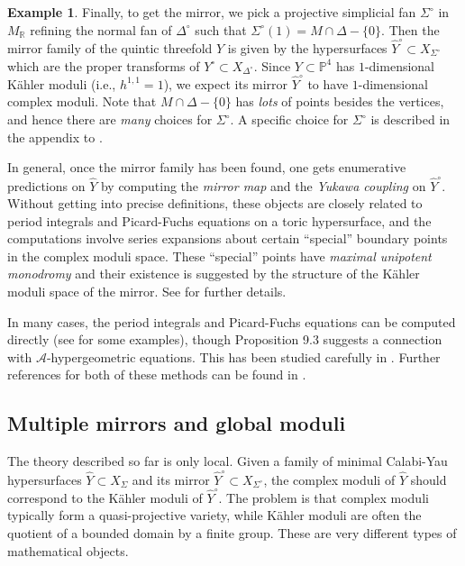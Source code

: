 \documentclass{amsart}
\theoremstyle{plain}
\theoremstyle{definition}
\newtheorem*{example}{Example}
\begin{document}
\begin{example}
	Finally, to get the mirror, we pick a projective simplicial
fan $\Sigma^\circ$ in $M_\mathbb{R}$ refining the normal fan of
$\Delta^\circ$ such that $\Sigma^\circ(1) = M\cap\Delta-\{0\}$.  Then
the mirror family of the quintic threefold $Y$ is given by the
hypersurfaces $\widehat Y^\circ \subset X_{\Sigma^\circ}$ which are
the proper transforms of $Y^\circ \subset X_{\Delta^\circ}$.  Since $Y
\subset \mathbb{P}^4$ has $1$-dimensional K\"ahler moduli (i.e.,
$h^{1,1} = 1$), we expect its mirror $\widehat Y^\circ$ to have
$1$-dimensional complex moduli.  Note that $M\cap\Delta-\{0\}$ has
{\it lots\/} of points besides the vertices, and hence there are {\it
many\/} choices for $\Sigma^\circ$.  A specific choice for
$\Sigma^\circ$ is described in the appendix to
\cite{Mor3}.
\end{example}

	In general, once the mirror family has been found, one gets
enumerative predictions on $\widehat Y$ by computing the {\it mirror
map\/} and the {\it Yukawa coupling\/} on $\widehat Y^\circ$.  Without
getting into precise definitions, these objects are closely related to
period integrals and Picard-Fuchs equations on a toric hypersurface,
and the computations involve series expansions about certain
``special'' boundary points in the complex moduli space.  These
``special'' points have {\it maximal unipotent monodromy\/} and their
existence is suggested by the structure of the K\"ahler moduli space
of the mirror.  See \cite{Mor2,Mor3} for further details.

	In many cases, the period integrals and Picard-Fuchs equations
can be computed directly (see \cite{Mor4} for some examples), though
Proposition 9.3 suggests a connection with $\mathcal{A}$-hypergeometric
equations.  This has been studied carefully in \cite{HLY1,HLY2}.  Further
references for both of these methods can be found in \cite{Mor2}.

\subsection{Multiple mirrors and global moduli} The theory
described so far is only local.  Given a family of minimal Calabi-Yau
hypersurfaces $\widehat Y \subset X_\Sigma$ and its mirror $\widehat
Y^\circ \subset X_{\Sigma^\circ}$, the complex moduli of $\widehat Y$
should correspond to the K\"ahler moduli of $\widehat Y^\circ$.  The
problem is that complex moduli typically form a quasi-projective
variety, while K\"ahler moduli are often the quotient of a bounded
domain by a finite group.  These are very different types of
mathematical objects.
\end{document}
